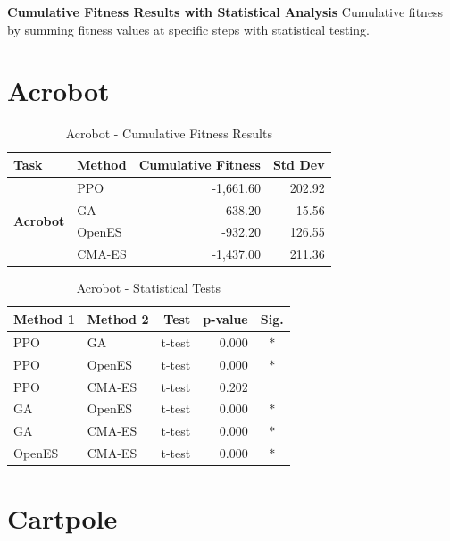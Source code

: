 \documentclass[12pt]{article}
\begin{document}
\begin{center}
\Large\textbf{Cumulative Fitness Results with Statistical Analysis}
\vspace{0.5cm}
\normalsize Cumulative fitness by summing fitness values at specific steps with statistical testing.
\vspace{0.5cm}
\end{center}

\section{Acrobot}

\begin{table}[h!]
\centering
\caption{Acrobot - Cumulative Fitness Results}
\begin{tabular}{|l|l|r|r|}
\hline
\textbf{Task} & \textbf{Method} & \textbf{Cumulative Fitness} & \textbf{Std Dev} \\
\hline\hline
\multirow{4}{*}{\textbf{Acrobot}} & \rowcolor{ppo!20}PPO & -1,661.60 & 202.92 \\
\cline{2-4}
 & \rowcolor{ga!20}GA & -638.20 & 15.56 \\
\cline{2-4}
 & \rowcolor{openes!20}OpenES & -932.20 & 126.55 \\
\cline{2-4}
 & \rowcolor{cmaes!20}CMA-ES & -1,437.00 & 211.36 \\
\hline
\end{tabular}
\end{table}

\begin{table}[h!]
\centering
\caption{Acrobot - Statistical Tests}
\begin{tabular}{|l|l|r|r|c|}
\hline
\textbf{Method 1} & \textbf{Method 2} & \textbf{Test} & \textbf{p-value} & \textbf{Sig.} \\
\hline\hline
PPO & GA & t-test & 0.000 & $*$ \\
PPO & OpenES & t-test & 0.000 & $*$ \\
PPO & CMA-ES & t-test & 0.202 &  \\
GA & OpenES & t-test & 0.000 & $*$ \\
GA & CMA-ES & t-test & 0.000 & $*$ \\
OpenES & CMA-ES & t-test & 0.000 & $*$ \\
\hline
\end{tabular}
\end{table}

\section{Cartpole}
\end{document}
